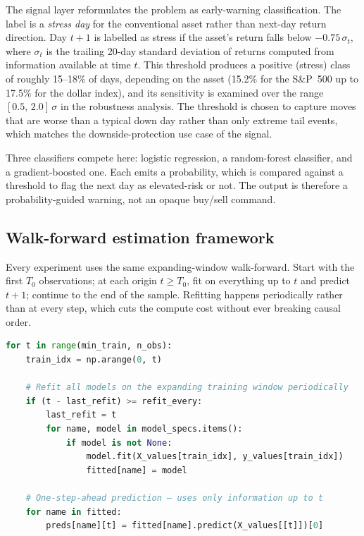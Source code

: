 The signal layer reformulates the problem as early-warning classification. The label is a \emph{stress day} for the conventional asset rather than next-day return direction. Day $t+1$ is labelled as stress if the asset's return falls below $-0.75\,\sigma_t$, where $\sigma_t$ is the trailing 20-day standard deviation of returns computed from information available at time $t$. This threshold produces a positive (stress) class of roughly 15--18\% of days, depending on the asset (15.2\% for the S\&P~500 up to 17.5\% for the dollar index), and its sensitivity is examined over the range $[0.5,\,2.0]\,\sigma$ in the robustness analysis. The threshold is chosen to capture moves that are worse than a typical down day rather than only extreme tail events, which matches the downside-protection use case of the signal.

Three classifiers compete here: logistic regression, a random-forest classifier, and a gradient-boosted one. Each emits a probability, which is compared against a threshold to flag the next day as elevated-risk or not. The output is therefore a probability-guided warning, not an opaque buy/sell command.

\subsection{Walk-forward estimation framework}

Every experiment uses the same expanding-window walk-forward. Start with the first $T_0$ observations; at each origin $t \geq T_0$, fit on everything up to $t$ and predict $t+1$; continue to the end of the sample. Refitting happens periodically rather than at every step, which cuts the compute cost without ever breaking causal order.

\begin{lstlisting}[language=Python, caption={Expanding-window walk-forward loop (\texttt{pipeline.py}).}, label=lst:walkforward]
for t in range(min_train, n_obs):
    train_idx = np.arange(0, t)

    # Refit all models on the expanding training window periodically
    if (t - last_refit) >= refit_every:
        last_refit = t
        for name, model in model_specs.items():
            if model is not None:
                model.fit(X_values[train_idx], y_values[train_idx])
                fitted[name] = model

    # One-step-ahead prediction — uses only information up to t
    for name in fitted:
        preds[name][t] = fitted[name].predict(X_values[[t]])[0]
\end{lstlisting}

